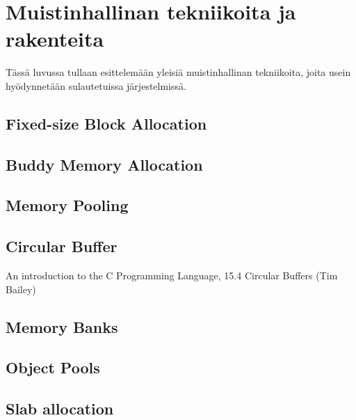 \chapter{Muistinhallinan tekniikoita ja rakenteita} \label{Neljäs luku}

Tässä luvussa tullaan esittelemään yleisiä muistinhallinan tekniikoita, joita usein hyödynnetään sulautetuissa järjestelmissä.

\section{Fixed-size Block Allocation}
\section{Buddy Memory Allocation}
\section{Memory Pooling}
\section{Circular Buffer}

An introduction to the C Programming Language, 15.4 Circular Buffers (Tim Bailey)

\section{Memory Banks}
\section{Object Pools}
\section{Slab allocation}
